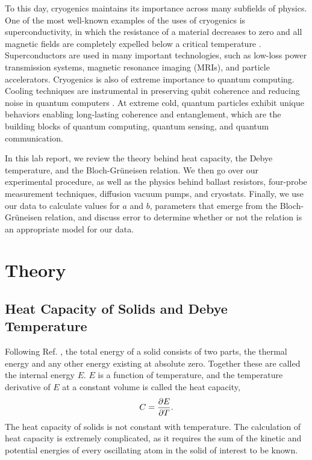 \documentclass[11pt,letterpaper]{article}
\begin{document}
To this day, cryogenics maintains its importance across many subfields of physics. One of the most well-known examples of the uses of cryogenics is superconductivity, in which the resistance of a material decreases to zero and all magnetic fields are completely expelled below a critical temperature \cite{Ganni}. Superconductors are used in many important technologies, such as low-loss power transmission systems, magnetic resonance imaging (MRIs), and particle accelerators. Cryogenics is also of extreme importance to quantum computing. Cooling techniques are instrumental in preserving qubit coherence and reducing noise in quantum computers \cite{Dargan}. At extreme cold, quantum particles exhibit unique behaviors enabling long-lasting coherence and entanglement, which are the building blocks of quantum computing, quantum sensing, and quantum communication.

In this lab report, we review the theory behind heat capacity, the Debye temperature, and the Bloch-Grüneisen relation. We then go over our experimental procedure, as well as the physics behind ballast resistors, four-probe measurement techniques, diffusion vacuum pumps, and cryostats. Finally, we use our data to calculate values for $a$ and $b$, parameters that emerge from the Bloch-Grüneisen relation, and discuss error to determine whether or not the relation is an appropriate model for our data.

\section{Theory}

\subsection{Heat Capacity of Solids and Debye Temperature} \label{subsection}

Following Ref. \cite{Wert}, the total energy of a solid consists of two parts, the thermal energy and any other energy existing at absolute zero. Together these are called the internal energy $E$. $E$ is a function of temperature, and the temperature derivative of $E$ at a constant volume is called the heat capacity,
\begin{equation}
    C = {\partial E \over \partial T} .
\end{equation}
The heat capacity of solids is not constant with temperature. The calculation of heat capacity is extremely complicated, as it requires the sum of the kinetic and potential energies of every oscillating atom in the solid of interest to be known. 
\end{document}
